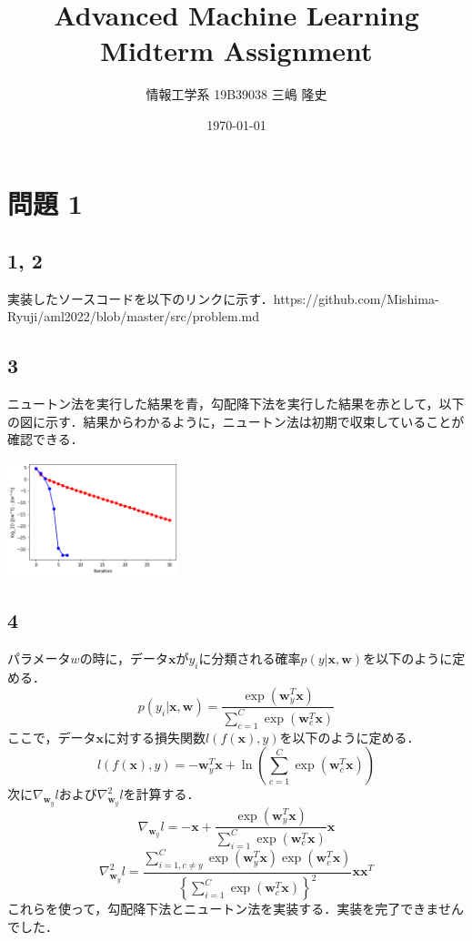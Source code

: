 \documentclass[a4paper,11pt]{jsarticle}
\begin{document}
\title{Advanced Machine Learning Midterm Assignment}
\author{情報工学系 19B39038 三嶋 隆史}
\date{\today}

\maketitle

\section*{問題 1}
\subsection*{1, 2}
\hbox{実装したソースコードを以下のリンクに示す．}{https://github.com/Mishima-Ryuji/aml2022/blob/master/src/problem.md}

\subsection*{3}
ニュートン法を実行した結果を青，勾配降下法を実行した結果を赤として，以下の図に示す．結果からわかるように，ニュートン法は初期で収束していることが確認できる．
\begin{center}
    \includegraphics[width=5cm]{../src/output_7_1.png} \\
\end{center}

\subsection*{4}
パラメータ$w$の時に，データ$\bm x$が$y_i$に分類される確率$p(y|\bm x, \bm w)$を以下のように定める．
$$
    p(y_i|\bm x, \bm w) = \frac{\exp(\bm{w}_y^T\bm{x})}{\sum_{c=1}^{C} \exp(\bm{w}_c^T\bm{x})}
$$
ここで，データ$\bm x$に対する損失関数$l(f(\bm x), y)$を以下のように定める．
$$
    l(f(\bm x), y) = -\bm{w}_y^T \bm x + \ln \left(\sum_{c=1}^C \exp(\bm{w}_c^T \bm x) \right)
$$
次に$\nabla_{\bm{w}_y} l$および$\nabla_{\bm{w}_y}^2 l$を計算する．
$$
    \nabla_{\bm{w}_y} l = - \bm x +
    \frac{\exp(\bm{w}_y^T \bm x)}{\sum_{i = 1}^{C} \exp(\bm w_c^T \bm x)} \bm x
$$
$$
    \nabla_{\bm{w}_y}^2 l =
    \frac{\sum_{i = 1, c \neq y}^{C} \exp(\bm w_y^T \bm x) \exp(\bm w_c^T \bm x)}{ \left\{ \sum_{i = 1}^{C} \exp(\bm w_c^T \bm x) \right\}^2 }\bm{x}\bm x^T
$$
これらを使って，勾配降下法とニュートン法を実装する．実装を完了できませんでした．
\end{document}
